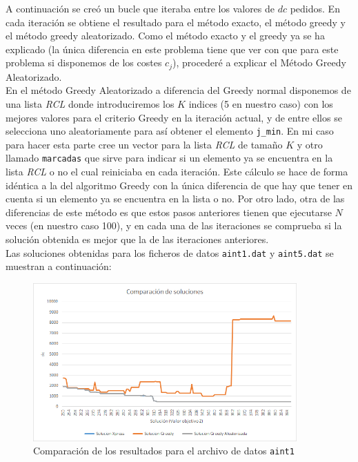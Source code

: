 \documentclass[a4paper,11pt]{article}
\begin{document}
A continuación se creó un bucle que iteraba entre los valores de ${dc}$ pedidos.  En cada iteración se obtiene el resultado para el método exacto, el método greedy y el método greedy aleatorizado. Como el método exacto y el greedy ya se ha explicado (la única diferencia en este problema tiene que ver con que para este problema si disponemos de los costes ${c_{j}}$), procederé a explicar el Método Greedy Aleatorizado.\\

En el método Greedy Aleatorizado a diferencia del Greedy normal disponemos de una lista \textit{RCL} donde introduciremos los ${K}$ indices (5 en nuestro caso) con los mejores valores para el criterio Greedy en la iteración actual, y de entre ellos se selecciona uno aleatoriamente para así obtener el elemento \texttt{j\_min}. En mi caso para hacer esta parte
cree un vector para la lista \textit{RCL} de tamaño ${K}$ y otro llamado \texttt{marcadas} que sirve para indicar si un elemento ya se encuentra en la lista \textit{RCL} o no el cual reiniciaba en cada iteración. Este cálculo se hace de forma idéntica a la del algoritmo Greedy con la única diferencia de que hay que tener en cuenta si un elemento ya se encuentra en la lista o no. Por otro lado, otra de las diferencias de este método es que estos pasos anteriores tienen que ejecutarse ${N}$ veces (en nuestro caso 100), y en cada una de las iteraciones se comprueba si la solución obtenida es mejor que la de las iteraciones anteriores.\\

Las soluciones obtenidas para los ficheros de datos \texttt{aint1.dat} y \texttt{aint5.dat} se muestran a continuación:

\begin{figure}[!htbp]
	\centering
	\includegraphics[width=0.9\textwidth]{6_2_aint1_comparacion.png}
    \caption{Comparación de los resultados para el archivo de datos \texttt{aint1}}
\end{figure}
\end{document}
